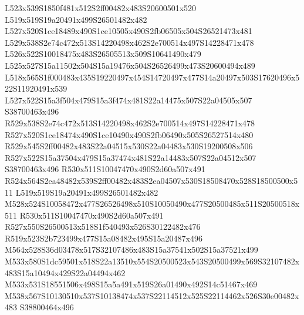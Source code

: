 \documentclass{article}
\begin{document}
\begin{multicols}{2}


L523x539S1850f481x512S2ff00482x483S20600501x520 L519x519S19a20491x499S26501482x482 L527x520S1ce18489x490S1ce10505x490S2fb06505x504S26521473x481 L529x538S2e74c472x513S14220498x462S2e700514x497S14228471x478 L526x522S10018475x483S26505513x509S10641490x479 L525x527S15a11502x504S15a19476x504S26526499x473S20600494x489 L518x565S1f000483x435S19220497x454S14720497x477S14a20497x503S17620496x522S11920491x539 L527x522S15a3f504x479S15a3f474x481S22a14475x507S22a04505x507 S38700463x496 R529x538S2e74c472x513S14220498x462S2e700514x497S14228471x478 R527x520S1ce18474x490S1ce10490x490S2fb06490x505S26527514x480 R529x545S2ff00482x483S22a04515x530S22a04483x530S19200508x506 R527x522S15a37504x479S15a37474x481S22a14483x507S22a04512x507 S38700463x496 R530x511S10047470x490S2d60a507x491 R524x564S2ea48482x539S2ff00482x483S2ea04507x530S18508470x528S18500500x511 L519x519S19a20491x499S26501482x482 M528x524S10058472x477S26526498x510S10050490x477S20500485x511S20500518x511 R530x511S10047470x490S2d60a507x491 R527x550S26500513x518S1f540493x526S30122482x476 R519x523S2b723499x477S15a08482x495S15a20487x496 M564x528S36d03478x517S32107486x483S15a37541x502S15a37521x499 M533x580S1dc59501x518S22a13510x554S20500523x543S20500499x569S32107482x483S15a10494x429S22a04494x462 M533x531S18551506x498S15a5a491x519S26a01490x492S14c51467x469 M538x567S10130510x537S10138474x537S22114512x525S22114462x526S30e00482x483 S38800464x496






\end{multicols}
\end{document}
